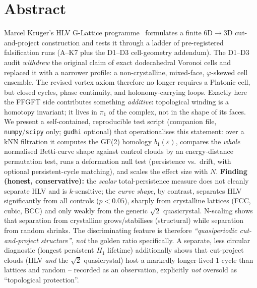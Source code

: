 
\newtheorem*{observation*}{Observation}

\section*{Abstract}
Marcel Krüger's HLV G-Lattice programme~\cite{krueger276main} formulates a
finite 6D$\to$3D cut-and-project construction and tests it through a ladder of
pre-registered falsification runs (A--K7 plus the D1--D3 cell-geometry
addendum). The D1--D3 audit \emph{withdrew} the original claim of exact
dodecahedral Voronoi cells and replaced it with a narrower profile: a
non-crystalline, mixed-face, $\varphi$-skewed cell ensemble. The revised
vortex axiom therefore no longer requires a Platonic cell, but closed cycles,
phase continuity, and holonomy-carrying loops. Exactly here the FFGFT side
contributes something \emph{additive}: topological winding is a homotopy
invariant; it lives in $\pi_1$ of the complex, not in the shape of its faces.
We present a self-contained, reproducible test script (companion file,
\texttt{numpy}/\texttt{scipy} only; \texttt{gudhi} optional) that
operationalises this statement: over a kNN filtration it computes the GF(2)
homology $b_1(\varepsilon)$, compares the \emph{whole} normalised Betti-curve
shape against control clouds by an energy-distance permutation test, runs a
deformation null test (persistence vs.\ drift, with optional persistent-cycle
matching), and scales the effect size with $N$. \textbf{Finding (honest,
conservative):} the \emph{scalar} total-persistence measure does not cleanly
separate HLV and is $k$-sensitive; the \emph{curve shape}, by contrast,
separates HLV significantly from all controls ($p<0.05$), sharply from
crystalline lattices (FCC, cubic, BCC) and only weakly from the generic
$\sqrt{2}$ quasicrystal. N-scaling shows that separation from crystalline
grows/stabilises (structural) while separation from random shrinks. The
discriminating feature is therefore \emph{``quasiperiodic cut-and-project
structure''}, \emph{not} the golden ratio specifically. A separate, less
circular diagnostic (longest persistent $H_1$ lifetime) additionally shows that
cut-project clouds (HLV \emph{and} the $\sqrt{2}$ quasicrystal) host a markedly
longer-lived $1$-cycle than lattices and random -- recorded as an observation,
explicitly \emph{not} oversold as ``topological protection''.

